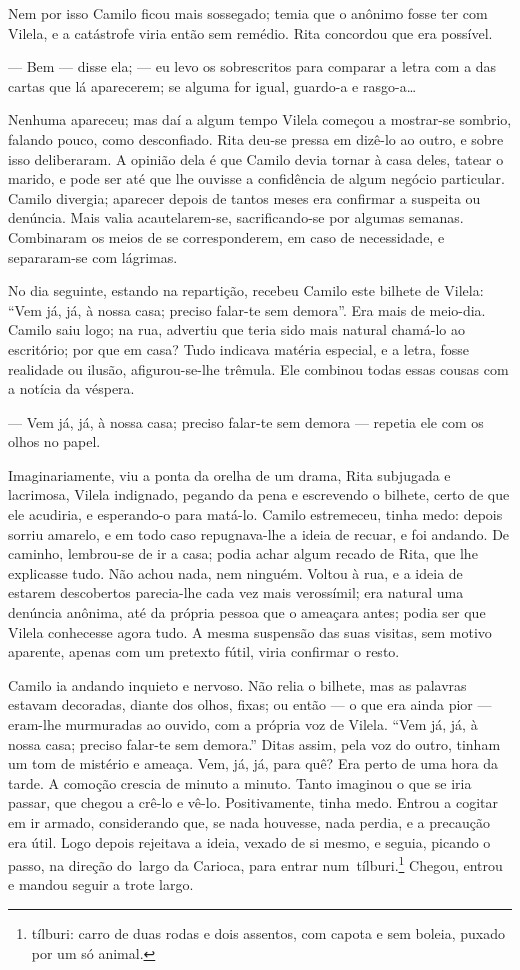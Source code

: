 Nem por isso Camilo ficou mais sossegado; temia que o anônimo fosse ter
com Vilela, e a catástrofe viria então sem remédio. Rita concordou que
era possível.

--- Bem --- disse ela; --- eu levo os sobrescritos para comparar a letra
com a das cartas que lá aparecerem; se alguma for igual, guardo-a e
rasgo-a\ldots{}

Nenhuma apareceu; mas daí a algum tempo Vilela começou a mostrar-se
sombrio, falando pouco, como desconfiado. Rita deu-se pressa em dizê-lo
ao outro, e sobre isso deliberaram. A opinião dela é que Camilo devia
tornar à casa deles, tatear o marido, e pode ser até que lhe ouvisse a
confidência de algum negócio particular. Camilo divergia; aparecer
depois de tantos meses era confirmar a suspeita ou denúncia. Mais valia
acautelarem-se, sacrificando-se por algumas semanas. Combinaram os meios
de se corresponderem, em caso de necessidade, e separaram-se com
lágrimas.

No dia seguinte, estando na repartição, recebeu Camilo este bilhete de
Vilela: ``Vem já, já, à nossa casa; preciso falar-te sem demora''. Era
mais de meio-dia. Camilo saiu logo; na rua, advertiu que teria sido mais
natural chamá-lo ao escritório; por que em casa? Tudo indicava matéria
especial, e a letra, fosse realidade ou ilusão, afigurou-se-lhe trêmula.
Ele combinou todas essas cousas com a notícia da véspera.

--- Vem já, já, à nossa casa; preciso falar-te sem demora --- repetia
ele com os olhos no papel.

Imaginariamente, viu a ponta da orelha de um drama, Rita subjugada e
lacrimosa, Vilela indignado, pegando da pena e escrevendo o bilhete,
certo de que ele acudiria, e esperando-o para matá-lo. Camilo
estremeceu, tinha medo: depois sorriu amarelo, e em todo caso
repugnava-lhe a ideia de recuar, e foi andando. De caminho, lembrou-se
de ir a casa; podia achar algum recado de Rita, que lhe explicasse tudo.
Não achou nada, nem ninguém. Voltou à rua, e a ideia de estarem
descobertos parecia-lhe cada vez mais verossímil; era natural uma
denúncia anônima, até da própria pessoa que o ameaçara antes; podia ser
que Vilela conhecesse agora tudo. A mesma suspensão das suas visitas,
sem motivo aparente, apenas com um pretexto fútil, viria confirmar o
resto.

Camilo ia andando inquieto e nervoso. Não relia o bilhete, mas as
palavras estavam decoradas, diante dos olhos, fixas; ou então --- o que
era ainda pior --- eram-lhe murmuradas ao ouvido, com a própria voz de
Vilela. ``Vem já, já, à nossa casa; preciso falar-te sem demora.'' Ditas
assim, pela voz do outro, tinham um tom de mistério e ameaça. Vem, já,
já, para quê? Era perto de uma hora da tarde. A comoção crescia de
minuto a minuto. Tanto imaginou o que se iria passar, que chegou a
crê-lo e vê-lo. Positivamente, tinha medo. Entrou a cogitar em ir
armado, considerando que, se nada houvesse, nada perdia, e a precaução
era útil. Logo depois rejeitava a ideia, vexado de si mesmo, e seguia,
picando o passo, na direção do~largo da Carioca, para entrar
num~tílburi.\footnote{tílburi: carro de duas rodas e dois assentos, com
  capota e sem boleia, puxado por um só animal.} Chegou, entrou e mandou
seguir a trote largo.

